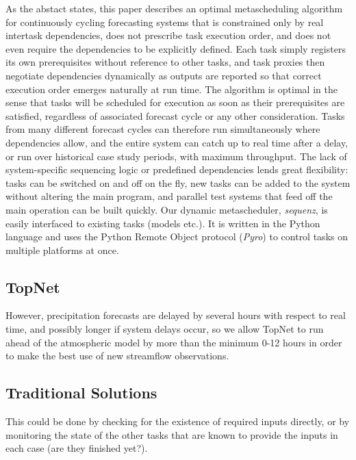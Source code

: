 \documentclass[11pt,a4paper]{article}
\begin{document}
As the abstact states, this paper describes an optimal metascheduling
algorithm for continuously cycling forecasting systems that is
constrained only by real intertask dependencies, does not prescribe task
execution order, and does not even require the dependencies to be
explicitly defined. Each task simply registers its own prerequisites
without reference to other tasks, and task proxies then negotiate
dependencies dynamically as outputs are reported so that correct
execution order emerges naturally at run time. The algorithm is optimal
in the sense that tasks will be scheduled for execution as soon as their
prerequisites are satisfied, regardless of associated forecast cycle or
any other consideration.  Tasks from many different forecast cycles can
therefore run simultaneously where dependencies allow, and the entire
system can catch up to real time after a delay, or run over historical
case study periods, with maximum throughput. The lack of system-specific
sequencing logic or predefined dependencies lends great flexibility:
tasks can be switched on and off on the fly, new tasks can be added to
the system without altering the main program, and parallel test systems
that feed off the main operation can be built quickly. Our dynamic
metascheduler, {\em sequenz}, is easily interfaced to existing tasks
(models etc.). It is written in the Python language and uses the Python
Remote Object protocol ({\em Pyro}) to control tasks on multiple
platforms at once. 

\subsection{TopNet}

However, precipitation forecasts are delayed by several hours with
respect to real time, and possibly longer if system delays occur, so we
allow TopNet to run ahead of the atmospheric model by more than the
minimum 0-12 hours in order to make the best use of new streamflow
observations.  

\subsection{Traditional Solutions}

This could be done by checking for the existence of required inputs
directly, or by monitoring the state of the other tasks that are known
to provide the inputs in each case (are they finished yet?).  
\end{document}
